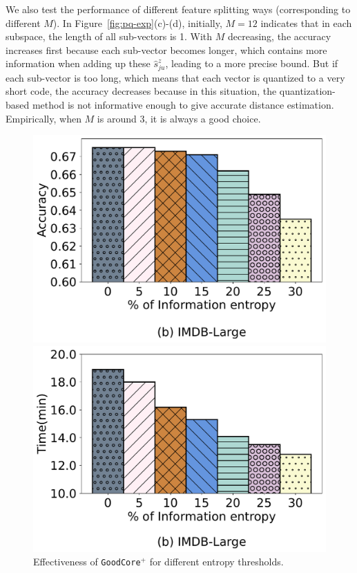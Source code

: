 We also test the performance of different feature splitting ways (corresponding to different $M$). In Figure~\ref{fig:pq-exp}(c)-(d), initially,  $M=12$ indicates that in each subspace, the length of all sub-vectors is 1. With $M$ decreasing, the accuracy increases first because each sub-vector becomes longer, which contains more information when adding up these $\hat{s}^z_{ju}$, leading to a more precise bound. But if each sub-vector is too long, which means that each vector is quantized to a very short code, the accuracy decreases because in this situation, the quantization-based method is not informative enough to give accurate  distance estimation. Empirically, when $M$ is around 3, it is always a good choice.

\begin{figure}[t]   
	\centering
	\begin{minipage}[t]{0.3\textwidth}
		\centering
		\includegraphics[width=\columnwidth]{figs/entropy_acc}
		\vspace{-1.5em}
		\caption{Effectiveness of \texttt{GoodCore}$^+$ for different entropy thresholds.}
		\label{fig:entropy_acc}
	\end{minipage}
\hspace{5em}
	\begin{minipage}[t]{0.3\textwidth}
		\centering
		\includegraphics[width=\columnwidth]{figs/entropy_time}

\end{minipage}
\end{figure}
